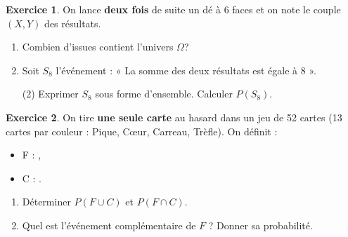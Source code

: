 \documentclass{exam}
\theoremstyle{definition}
\newtheorem{exercice}{Exercice}
\begin{document}
\begin{exercice}

On lance \textbf{deux fois} de suite un dé à 6 faces et on note le couple \((X,Y)\) des résultats.

\begin{enumerate}
  \item Combien d'issues contient l'univers \(\Omega\)?
  \item Soit \(S_8\) l'événement : « La somme des deux résultats est égale à 8 ».
  \begin{tasks}(2)
    \task Exprimer \(S_8\) sous forme d'ensemble.
    \task Calculer \(P(S_8)\).
  \end{tasks}
\end{enumerate}

\begin{center}
\end{center}
\end{exercice}

\begin{exercice}

On tire \textbf{une seule carte} au hasard dans un jeu de 52 cartes 
(13 cartes par couleur : Pique, Cœur, Carreau, Trèfle). On définit :
\begin{itemize}
	\item F : ,\quad
  \item C : .
\end{itemize}
\begin{enumerate}
  \item Déterminer \(P(F \cup C)\) et \(P(F \cap C)\).
  \item Quel est l'événement complémentaire de \(F\) ? Donner sa probabilité.
\end{enumerate}

\begin{center}
\end{center}
\end{exercice}
\end{document}
